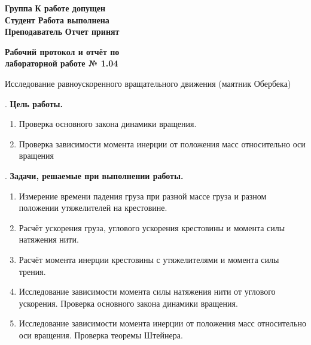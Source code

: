 \documentclass[12pt]{article}
\begin{document}
    \vspace*{2\baselineskip}

    \thispagestyle{fancy}

    \noindent
    \textbf{Группа} \underline{\hspace{4.85cm}} \hfill \textbf{К работе допущен} \underline{\hspace{4cm}} \\[0.5cm]
    \textbf{Студент} \underline{\hspace{4.6cm}} \hfill \textbf{Работа выполнена} \underline{\hspace{4cm}} \\[0.5cm]
    \textbf{Преподаватель} \underline{\hspace{3.2cm}} \hfill \textbf{Отчет принят} \underline{\hspace{4.85cm}} \\


    \begin{center}
    {\huge \textbf{Рабочий протокол и отчёт по\\ лабораторной работе № 1.04}}

        \smallvspace

        {\Large Исследование равноускоренного вращательного движения (маятник Обербека)}
    \end{center}


    . \textbf{Цель работы.}

    \begin{enumerate}
        \item Проверка основного закона динамики вращения.

        \item Проверка зависимости момента инерции от положения масс относительно оси вращения
    \end{enumerate}

    \mediumvspace

    . \textbf{Задачи, решаемые при выполнении работы.}

    \begin{enumerate}
        \item Измерение времени падения груза при разной массе груза и разном положении утяжелителей на крестовине.

        \item Расчёт ускорения груза, углового ускорения крестовины и момента силы натяжения нити.

        \item Расчёт момента инерции крестовины с утяжелителями и момента силы трения.

        \item Исследование зависимости момента силы натяжения нити от углового ускорения.
        Проверка основного закона динамики вращения.

        \item Исследование зависимости момента инерции от положения масс
        относительно оси вращения. Проверка теоремы Штейнера.
    \end{enumerate}
\end{document}
